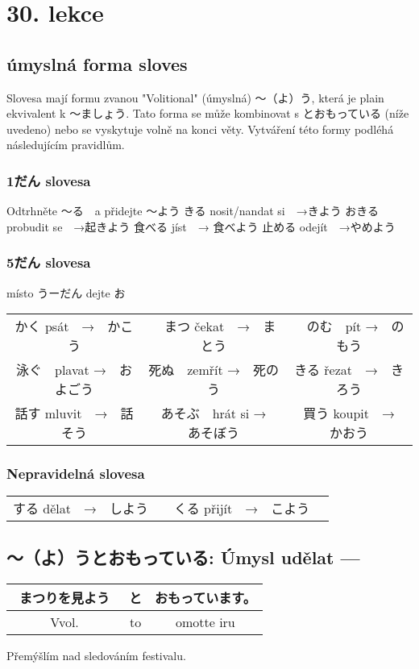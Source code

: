 
\section{30. lekce}
\label{sec:lekce_30}

\subsection{úmyslná forma sloves}


Slovesa mají formu zvanou "Volitional" (úmyslná) 〜（よ）う, která je plain ekvivalent k 〜ましょう. Tato forma se může kombinovat s とおもっている (níže uvedeno) nebo se vyskytuje volně na konci věty. Vytváření této formy podléhá následujícím pravidlům.

\subsubsection{1だん slovesa}
Odtrhněte 〜る　a přidejte 〜よう
きる nosit/nandat si　→きよう
おきる probudit se　→起きよう
食べる jíst　→ 食べよう
止める odejít　→やめよう

\subsubsection{5だん slovesa}
místo うーだん dejte お
\begin{center}
\begin{tabular}{c c c}
かく psát　→　かこう&　まつ čekat　→　まとう&　のむ　pít →　のもう\\
泳ぐ　plavat →　およごう&死ぬ　zemřít →　死のう&きる řezat　→　きろう\\
話す mluvit　→　話そう&あそぶ　hrát si →　あそぼう&買う koupit　→　かおう\\
\end{tabular}
\end{center}

\subsubsection{Nepravidelná slovesa}
\begin{center}
\begin{tabular}{c c c}
する dělat　→　しよう&　くる přijít　→　こよう\\
\end{tabular}
\end{center}


\subsection{〜（よ）うとおもっている: Úmysl udělat ---}
\begin{center}
\begin{tabular}{|| c | c | c ||}
\hline
まつりを見よう　&と&おもっています。\\
\hline
Vvol. &to&omotte iru\\
\hline
\end{tabular}
\end{center}
Přemýšlím nad sledováním festivalu.

